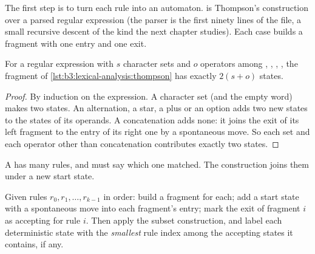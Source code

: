 The first step is to turn each rule into an automaton.  is Thompson's construction over a parsed regular expression (the parser is the first ninety lines of the file, a small recursive descent of the kind the next chapter studies). Each case builds a fragment with one entry and one exit.

\label{lst:b3:lexical-analysis:thompson}

\begin{proposition}\label{prop:b3:lexical-analysis:thompson-size}
For a regular expression with $s$ character sets and $o$ operators among \code{|}, \code{*}, \code{+}, , the fragment of \cref{lst:b3:lexical-analysis:thompson} has exactly $2(s + o)$ states.
\end{proposition}

\begin{proof}
By induction on the expression. A character set (and the empty word) makes two states. An alternation, a star, a plus or an option adds two new states to the states of its operands. A concatenation adds none: it joins the exit of its left fragment to the entry of its right one by a spontaneous move. So each set and each operator other than concatenation contributes exactly two states.
\end{proof}

A  has many rules, and must say which one matched. The construction joins them under a new start state.

\begin{method}\label{met:b3:lexical-analysis:union}
Given rules $r_0, r_1, \dots, r_{k-1}$ in order: build a fragment for each; add a start state with a spontaneous move into each fragment's entry; mark the exit of fragment $i$ as accepting for rule $i$. Then apply the subset construction, and label each deterministic state with the \emph{smallest} rule index among the accepting states it contains, if any.
\end{method}

\label{lst:b3:lexical-analysis:union}

